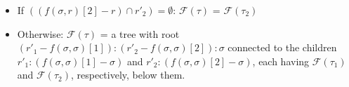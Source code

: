 {\begin{definition}
\begin{itemize}
\begin{itemize}
             If $((f(\sigma,r)[1] - r)\cap r'_1)  = \emptyset $:
             $\mathcal{F}(\tau) $ = $\mathcal{F}(\tau_1) $
             \item 
             If $((f(\sigma,r)[2] - r)\cap r'_2)  = \emptyset $:
             $\mathcal{F}(\tau) $ = $\mathcal{F}(\tau_2) $
             \item Otherwise:  
             $\mathcal{F}(\tau) $ = a tree with root $(r'_1 - f(\sigma,\sigma)[1]) : (r'_2 - f(\sigma,\sigma)[2]):\sigma$  connected to the children $r'_1 :(f(\sigma,\sigma)[1]-\sigma)$  and $r'_2 :(f(\sigma,\sigma)[2]-\sigma)$, each having 
             $\mathcal{F}(\tau_1)$ and $\mathcal{F}(\tau_2)$, respectively, below them. 
        \end{itemize}
    

    \end{itemize}
\end{definition}
}




